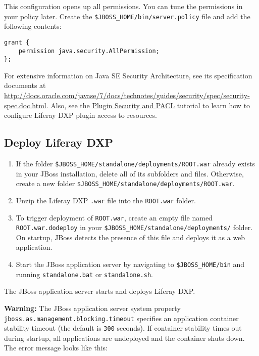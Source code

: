 This configuration opens up all permissions. You can tune the
permissions in your policy later. Create the
\texttt{\$JBOSS\_HOME/bin/server.policy} file and add the following
contents:

\begin{verbatim}
grant {
    permission java.security.AllPermission;
};
\end{verbatim}

For extensive information on Java SE Security Architecture, see its
specification documents at
\url{http://docs.oracle.com/javase/7/docs/technotes/guides/security/spec/security-spec.doc.html}.
Also, see the
\href{/docs/6-2/tutorials/-/knowledge_base/t/plugin-security-and-pacl}{Plugin
Security and PACL} tutorial to learn how to configure Liferay DXP plugin
access to resources.

\subsection{Deploy Liferay DXP}\label{deploy-liferay-dxp-1}

\begin{enumerate}
\def\labelenumi{\arabic{enumi}.}
\item
  If the folder \texttt{\$JBOSS\_HOME/standalone/deployments/ROOT.war}
  already exists in your JBoss installation, delete all of its
  subfolders and files. Otherwise, create a new folder
  \texttt{\$JBOSS\_HOME/standalone/deployments/ROOT.war}.
\item
  Unzip the Liferay DXP \texttt{.war} file into the \texttt{ROOT.war}
  folder.
\item
  To trigger deployment of \texttt{ROOT.war}, create an empty file named
  \texttt{ROOT.war.dodeploy} in your
  \texttt{\$JBOSS\_HOME/standalone/deployments/} folder. On startup,
  JBoss detects the presence of this file and deploys it as a web
  application.
\item
  Start the JBoss application server by navigating to
  \texttt{\$JBOSS\_HOME/bin} and running \texttt{standalone.bat} or
  \texttt{standalone.sh}.
\end{enumerate}

The JBoss application server starts and deploys Liferay DXP.

\noindent\hrulefill

\textbf{Warning:} The JBoss application server system property
\texttt{jboss.as.management.blocking.timeout} specifies an application
container stability timeout (the default is \texttt{300} seconds). If
container stability times out during startup, all applications are
undeployed and the container shuts down. The error message looks like
this:

